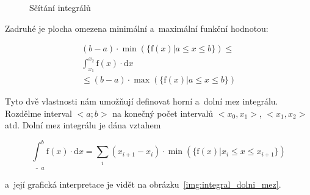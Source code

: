 \begin{figure}[ht]
\begin{center}
\caption{Sčítání integrálů}
\end{center}
\label{img:scitani_integralu}
\end{figure}

Zadruhé je plocha omezena minimální a~maximální funkční hodnotou:

\begin{equation}
\begin{split}
(b - a) \cdot \min(\{\mathrm{f}(x) | a \leq x \leq b\}) \leq \\
\int_{x_1}^{x_2} \mathrm{f}(x) \cdot \mathrm{d}x \\
\leq (b - a) \cdot \max(\{\mathrm{f}(x) | a \leq x \leq b\})
\end{split}
\end{equation}

Tyto dvě vlastnosti nám umožňují definovat horní a~dolní mez integrálu. Rozdělme interval \(<a; b>\) na konečný počet intervalů \(<x_0, x_1>\), \(<x_1, x_2>\) atd. Dolní mez integrálu je dána vztahem

\begin{equation}
\label{eq:dolni_mez_integralu}
\underline{\int}_a^b \mathrm{f}(x) \cdot \mathrm{d}x = \sum_{i} (x_{i+1} - x_i) \cdot \min(\{\mathrm{f}(x) | x_i \leq x \leq x_{i+1}\})
\end{equation}

a~její grafická interpretace je vidět na obrázku~\ref{img:integral_dolni_mez}.


